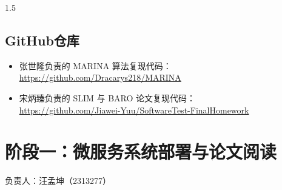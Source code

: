 \documentclass[a4paper,12pt]{report}
\begin{document}
\begin{spacing}{1.5}
\section{GitHub仓库}
\begin{itemize}
    \item 张世隆负责的 MARINA 算法复现代码：\\
        \url{https://github.com/Dracarys218/MARINA}
    \item 宋炳臻负责的 SLIM 与 BARO 论文复现代码：\\
        \url{https://github.com/Jiawei-Yuu/SoftwareTest-FinalHomework}
\end{itemize}

\end{spacing}

\chapter*{阶段一：微服务系统部署与论文阅读}
\vspace{-0.5em}
\begin{flushright}
{\kaishu{} 负责人：汪孟坤（2313277）}
\end{flushright}
\end{document}

